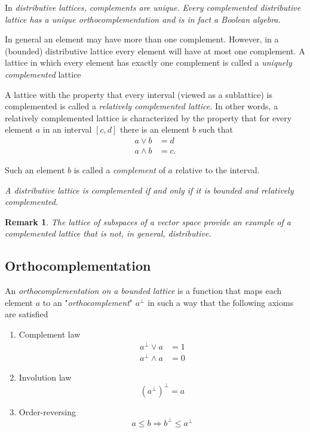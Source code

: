 \documentclass[aps,preprint]{revtex4}%
\newtheorem{remark}[theorem]{Remark}
\begin{document}
In \emph{distributive lattices, complements are unique.} \emph{Every
complemented distributive lattice has a unique orthocomplementation and is in
fact a Boolean algebra.}

In general an element may have more than one complement. However, in a
(bounded) distributive lattice every element will have at most one complement.
A lattice in which every element has exactly one complement is called a
\emph{uniquely complemented} lattice

A lattice with the property that every interval (viewed as a sublattice) is
complemented is called a \emph{relatively complemented lattice}. In other
words, a relatively complemented lattice is characterized by the property that
for every element $a$ in an interval $[c,d]$ there is an element $b$ such
that
\begin{align}
a\vee b  &  =d\\
a\wedge b  &  =c.
\end{align}


Such an element $b$ is called a \emph{complement} of $a$ relative to the interval.

\emph{A distributive lattice is complemented if and only if it is bounded and
relatively complemented.}

\begin{remark}
\emph{The lattice of subspaces of a vector space provide an example of a
complemented lattice that is not, in general, distributive.}
\end{remark}

\subsection{Orthocomplementation}

An \emph{orthocomplementation on a bounded lattice} is a function that maps
each element $a$ to an "\emph{orthocomplement}" $a^{\bot}$ in such a way that
the following axioms are satisfied

\begin{enumerate}
\item Complement law%
\begin{align}
a^{\bot}\vee a  &  =1\\
a^{\bot}\wedge a  &  =0
\end{align}


\item Involution law%
\begin{equation}
\left(  a^{\bot}\right)  ^{\bot}=a
\end{equation}


\item Order-reversing%
\begin{equation}
a\leq b\Rightarrow b^{\bot}\leq a^{\bot}%
\end{equation}

\end{enumerate}
\end{document}
